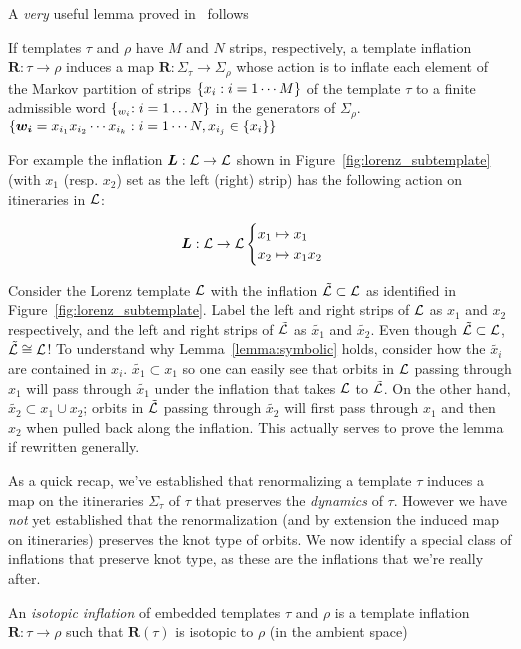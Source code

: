 \documentclass[paper.tex]{subfiles}
\begin{document}
A \emph{very} useful lemma proved in~\cite{knottyode} follows


\begin{lemma}
  If templates $\tau$ and $\rho$ have $M$ and $N$ strips, respectively, a template inflation $\bm{R}: \tau \to \rho$ induces a map $\bm{R}: \Sigma_\tau \to \Sigma_\rho$ whose action is to inflate each element of the Markov partition of strips $\{ x_i : i = 1\cdots M \}$ of the template $\tau$ to a finite
  admissible word $\{ \bm_{w_i}: i = 1 \dots N \}$ in the generators of $\Sigma_\rho$.  $\{ \bm{w_i} = x_{i_1} x_{i_2} \cdots x_{i_k} : i = 1 \cdots N, x_{i_j} \in \{ x_i \} \}$\label{lemma:symbolic}
\end{lemma}

For example the inflation $\bm{L} : \mathcal{L} \to \mathcal{L}$ shown in Figure~\ref{fig:lorenz_subtemplate} (with $x_1$ (resp. $x_2$) set as the left (right) strip) has the following action on itineraries in $\mathcal{L}$:

\begin{equation}
\bm{L} : \mathcal{L} \to \mathcal{L}  \begin{cases} x_1 \mapsto x_1 \\ x_2 \mapsto x_1 x_2 \end{cases}
\end{equation}

Consider the Lorenz template $\mathcal{L}$ with the inflation $\tilde{\mathcal{L}} \subset \mathcal{L}$ as identified in Figure~\ref{fig:lorenz_subtemplate}.
Label the left and right strips of $\mathcal{L}$ as $x_1$ and $x_2$ respectively, and the left and right strips of $\tilde{\mathcal{L}}$ as $\tilde{x_1}$ and $\tilde{x_2}$.
Even though $\tilde{\mathcal{L}} \subset \mathcal{L}$, $\tilde{\mathcal{L}} \cong \mathcal{L}$! To understand why Lemma~\ref{lemma:symbolic} holds, consider how the $\tilde{x_i}$ are contained in $x_i$. $\tilde{x_1} \subset x_1$ so one can easily see that
orbits in $\mathcal{L}$ passing through $x_1$ will pass through $\tilde{x_1}$ under the inflation that takes $\mathcal{L}$ to $\tilde{\mathcal{L}}$. On the other hand, $\tilde{x_2} \subset x_1 \cup x_2$; orbits in $\tilde{\mathcal{L}}$ passing through
$\tilde{x_2}$ will first pass through $x_1$ and then $x_2$ when pulled back along the inflation. This actually serves to prove the lemma if rewritten generally.

As a quick recap, we've established that renormalizing a template $\tau$ induces a map on the itineraries $\Sigma_\tau$ of $\tau$ that preserves the \emph{dynamics} of $\tau$. However we have \emph{not} yet established
that the renormalization (and by extension the induced map on itineraries)  preserves the knot type of orbits. We now identify a special class of inflations that preserve knot type, as these are the inflations that we're really after.

\begin{definition}
  An \emph{isotopic inflation} of embedded templates $\tau$ and $\rho$ is a template inflation $\bm{R}: \tau \to \rho$ such that $\bm{R}(\tau)$ is isotopic to $\rho$ (in the ambient space)
\end{definition}
\end{document}

